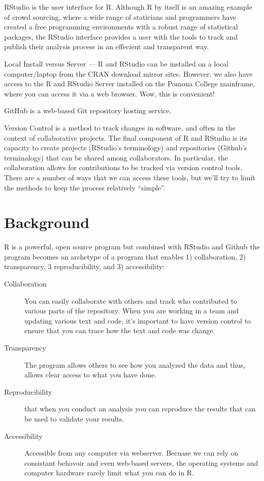 \documentclass[12pt]{../SOP4_alpha}\usepackage[]{graphicx}\usepackage[]{xcolor}
\begin{document}
\NP RStudio is the user interface for R. Although R by itself is an amazing example of crowd sourcing, where a wide range of staticians and programmers have created a free programming environments with a robust range of statistical packages, the RStudio interface provides a user with the tools to track and publish their analysis process in an effecient and transparent way. 

\NP Local Install versus Server --- R and RStudio can be installed on a local computer/laptop from the CRAN download mirror sites. However, we also have access to the R and RStudio Server installed on the Pomona College mainframe, where you can access it via a web browser. Wow, this is convenient!

\NP GitHub is a web-based Git repository hosting service. 

\NP Version Control is a method to track changes in software, and often in the context of collaborative projects. The final component of R and RStudio is its capacity to create projects (RStudio's terminology) and repositories (Github's terminalogy) that can be shared among collaborators. In particular, the collaboration allows for contributions to be tracked via version control tools. There are a number of ways that we can access these tools, but we'll try to limit the methods to keep the process relatively ``simple''.


\section{Background}

\NP R is a powerful, open source program but combined with RStudio and Github the program becomes an archetype of a program that enables 1) collaboration, 2) transparency, 3 reproducibility, and 3) accessibility: 

\begin{description}
    \item[Collaboration] You can easily collaborate with others and track who contributed to various parts of the repository. When you are working in a team and updating various text and code, it's important to have version control to ensure that you can trace how the text and code was change. 
    
    \item[Transparency] The program allows others to see how you analyzed the data and thus, allows clear access to what you have done.
    
  \item[Reproducibility]  that when you conduct an analysis you can reproduce the results that can be used to validate your results. 
  
  \item[Accessibility] Accessible from any computer via webserver. Becuase we can rely on consistant behavoir and even web-based servers, the operating systems and computer hardware rarely limit what you can do in R.

\end{description}
\end{document}
